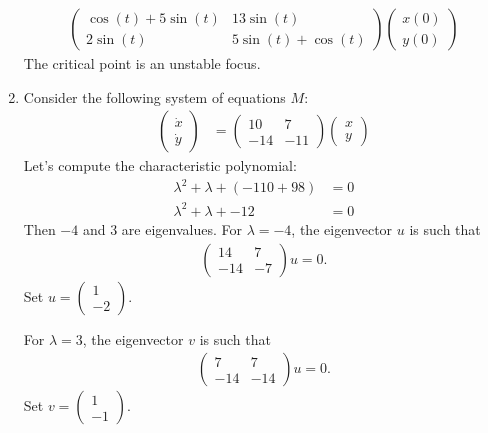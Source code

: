 \documentclass[12pt,letterpaper]{article}
\begin{document}
\begin{enumerate}[label=(\alph*)]
\begin{align}
\begin{pmatrix}
			      \cos(t) + 5\sin(t) & 13 \sin(t)         \\
			      2\sin(t)           & 5\sin(t) + \cos(t)
		      \end{pmatrix}
		      \begin{pmatrix}
			      x(0) \\
			      y(0)
		      \end{pmatrix}
	      \end{align}
	      The critical point is an unstable focus.
	\item Consider the following system of equations $M$:
	      \begin{align}
		      \begin{pmatrix}
			      \dot{x} \\
			      \dot{y}
		      \end{pmatrix} & = \begin{pmatrix}
			      10  & 7   \\
			      -14 & -11
		      \end{pmatrix}
		      \begin{pmatrix}
			      x \\
			      y
		      \end{pmatrix}
	      \end{align}
	      Let's compute the characteristic polynomial:
	      \begin{align}
		      \lambda^2 + \lambda + (-110 + 98) & = 0 \\
		      \lambda^2 + \lambda + -12         & = 0
	      \end{align}
	      Then $-4$ and $3$ are eigenvalues.
	      For $\lambda = -4$, the eigenvector $u$ is such that
	      \begin{align}
		      \begin{pmatrix}
			      14  & 7  \\
			      -14 & -7
		      \end{pmatrix}u = 0.
	      \end{align}
	      Set $u = \begin{pmatrix}
			      1  \\
			      -2
		      \end{pmatrix}$.

	      For $\lambda = 3$, the eigenvector $v$ is such that
	      \begin{align}
		      \begin{pmatrix}
			      7   & 7   \\
			      -14 & -14
		      \end{pmatrix}u = 0.
	      \end{align}
	      Set $v = \begin{pmatrix}
			      1  \\
			      -1
		      \end{pmatrix}$.


\end{enumerate}
\end{document}
